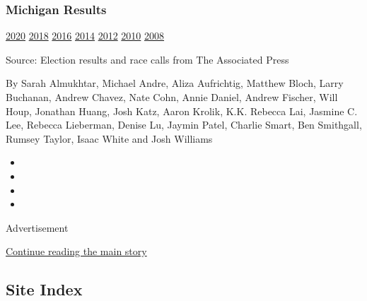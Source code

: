 \hypertarget{michigan-results}{%
\subsubsection{Michigan Results}\label{michigan-results}}

\href{https://www.nytimes.com/interactive/2020/08/04/us/elections/results-michigan-primary-elections.html?action=click\&module=ELEX_results\&pgtype=Interactive\&region=PastResultsFooter}{2020}
\href{https://www.nytimes.com/interactive/2018/11/06/us/elections/results-michigan-elections.html?action=click\&module=ELEX_results\&pgtype=Interactive\&region=PastResultsFooter}{2018}
\href{https://www.nytimes.com/elections/2016/results/michigan?action=click\&module=ELEX_results\&pgtype=Interactive\&region=PastResultsFooter}{2016}
\href{https://www.nytimes.com/elections/2014/michigan-elections?action=click\&module=ELEX_results\&pgtype=Interactive\&region=PastResultsFooter}{2014}
\href{https://www.nytimes.com/elections/2012/results/states/michigan.html?action=click\&module=ELEX_results\&pgtype=Interactive\&region=PastResultsFooter}{2012}
\href{https://www.nytimes.com/elections/2010/results/michigan.html?action=click\&module=ELEX_results\&pgtype=Interactive\&region=PastResultsFooter}{2010}
\href{https://www.nytimes.com/elections/2008/results/states/michigan.html?action=click\&module=ELEX_results\&pgtype=Interactive\&region=PastResultsFooter}{2008}

Source: Election results and race calls from The Associated Press

By Sarah Almukhtar, Michael Andre, Aliza Aufrichtig, Matthew Bloch,
Larry Buchanan, Andrew Chavez, Nate Cohn, Annie Daniel, Andrew Fischer,
Will Houp, Jonathan Huang, Josh Katz, Aaron Krolik, K.K. Rebecca Lai,
Jasmine C. Lee, Rebecca Lieberman, Denise Lu, Jaymin Patel, Charlie
Smart, Ben Smithgall, Rumsey Taylor, Isaac White and Josh Williams

\begin{itemize}
\item
\item
\item
\item
\end{itemize}

Advertisement

\protect\hyperlink{after-bottom}{Continue reading the main story}

\hypertarget{site-index}{%
\subsection{Site Index}\label{site-index}}

